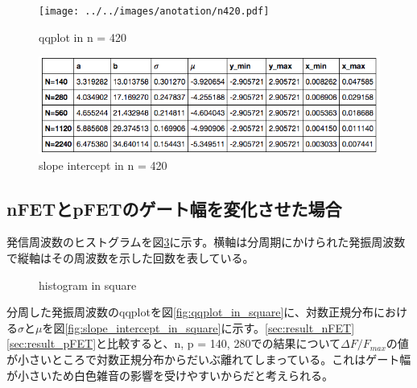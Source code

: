 \documentclass{jsarticle}
\begin{document}
\begin{figure}[hbtp]
	\centering
	\texttt{[image: ../../images/anotation/n420.pdf]}
	\caption{qqplot in n = 420}
	\label{fig:qqplot_in_n_420}
\end{figure}

\begin{figure}[hbtp]
	\centering
	\includegraphics[width=13cm]{../../least_squares/n420.png}
	\caption{slope intercept in n = 420}
	\label{fig:slope_intercept_in_n_420}
\end{figure}


\subsection{nFETとpFETのゲート幅を変化させた場合}
\label{sec:result_nFET_pFET}

発信周波数のヒストグラムを図\ref{fig:histogram_in_square}に示す。横軸は分周期にかけられた発振周波数で縦軸はその周波数を示した回数を表している。

\begin{figure}[hbtp]
	\centering
	\caption{histogram in square}
	\label{fig:histogram_in_square}
\end{figure}

分周した発振周波数のqqplotを図\ref{fig:qqplot_in_square}に、対数正規分布における$\sigma$と$\mu$を図\ref{fig:slope_intercept_in_square}に示す。\ref{sec:result_nFET}\ref{sec:result_pFET}と比較すると、n, p = 140, 280での結果について$\Delta F / F_{max}$の値が小さいところで対数正規分布からだいぶ離れてしまっている。これはゲート幅が小さいため白色雑音の影響を受けやすいからだと考えられる。
\end{document}
